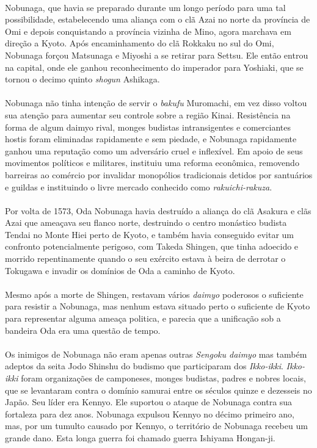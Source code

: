 \documentclass[12pt, a4paper]{article}
\begin{document}
            \\
            \indent Nobunaga, que havia se preparado durante um longo período para uma tal possibilidade, estabelecendo uma aliança com o clã Azai no norte da província de Omi e depois conquistando a província vizinha de Mino, agora marchava em direção a Kyoto. Após encaminhamento do clã Rokkaku no sul do Omi, Nobunaga forçou Matsunaga e Miyoshi a se retirar para Settsu. Ele então entrou na capital, onde ele ganhou reconhecimento do imperador para Yoshiaki, que se tornou o decimo quinto \textit{shogun} Ashikaga.\\
            \\
            \indent Nobunaga não tinha intenção de servir o \textit{bakufu} Muromachi, em vez disso voltou sua atenção para aumentar seu controle sobre a região Kinai. Resistência na forma de algum daimyo rival, monges budistas intransigentes e comerciantes hostis foram eliminadas rapidamente e sem piedade, e Nobunaga rapidamente ganhou uma reputação como um adversário cruel e inflexível. Em apoio de seus movimentos políticos e militares, instituiu uma reforma econômica, removendo barreiras ao comércio por invalidar monopólios tradicionais detidos por santuários e guildas e instituindo o livre mercado conhecido como \textit{rakuichi-rakuza}.\\
            \\
            \indent Por volta de 1573, Oda Nobunaga havia destruído a aliança do clã Asakura e clãs Azai que ameaçava seu flanco norte, destruindo o centro monástico budista Tendai no Monte Hiei perto de Kyoto, e também havia conseguido evitar um confronto potencialmente perigoso, com Takeda Shingen, que tinha adoecido e morrido repentinamente quando o seu exército estava à beira de derrotar o Tokugawa e invadir os domínios de Oda a caminho de Kyoto.\\
            \\
            \indent Mesmo após a morte de Shingen, restavam vários \textit{daimyo} poderosos o suficiente para resistir a Nobunaga, mas nenhum estava situado perto o suficiente de Kyoto para representar alguma ameaça politica, e parecia que a unificação sob a bandeira Oda era uma questão de tempo.\\
            \\
            \indent Os inimigos de Nobunaga não eram apenas outras \textit{Sengoku daimyo} mas também adeptos da seita Jodo Shinshu do budismo que participaram dos \textit{Ikko-ikki}. \textit{Ikko-ikki} foram organizações de camponeses, monges budistas, padres e nobres locais, que se levantaram contra o domínio samurai entre os séculos quinze e dezesseis no Japão. Seu líder era Kennyo. Ele suportou o ataque de Nobunaga contra sua fortaleza para dez anos. Nobunaga expulsou Kennyo no décimo primeiro ano, mas, por um tumulto causado por Kennyo, o território de Nobunaga recebeu um grande dano. Esta longa guerra foi chamado guerra Ishiyama Hongan-ji.\\
\end{document}
